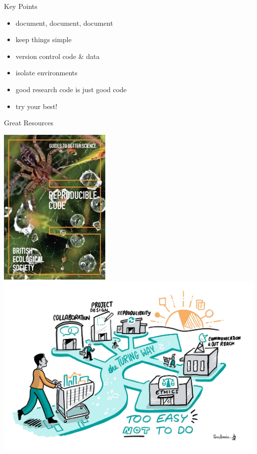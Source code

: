 \documentclass{beamer} %
\begin{document}
  \begin{frame}{Key Points}
    \begin{itemize}
      \item document, document, document
      \item keep things simple
      \item version control code \& data
      \item isolate environments
      \item good research code is just good code
      \item try your best!
    \end{itemize}
  \end{frame}

  \begin{frame}[label=RESOURCES]{Great Resources}
    \begin{center}
      \href{https://www.britishecologicalsociety.org/wp-content/uploads/2019/06/BES-Guide-Reproducible-Code-2019.pdf}{\includegraphics[height=0.4\textheight]{bes_reproducible_code.jpg}}
      \hspace{1cm}
      \href{https://the-turing-way.netlify.app/}{\includegraphics[height=0.4\textheight]{turing_way.jpg}}

\end{center}
\end{frame}
\end{document}
